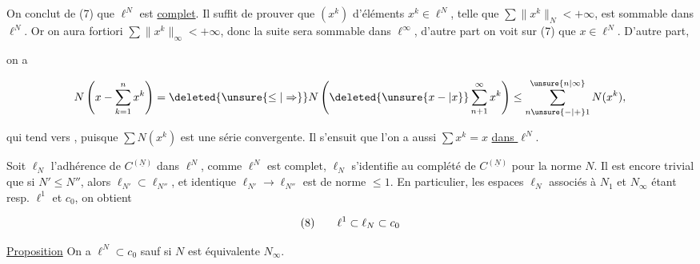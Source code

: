 
On conclut de (7) que $\ell^N$ est \uline{complet}. Il suffit de prouver que   $(x^k)$  d'éléments $x^k\in\ell^N$, telle que $\sum\lVert x^{k}\rVert_N<+\infty$, est sommable dans $\ell^N$. Or  on aura  fortiori $\sum\lVert x^k\rVert_\infty<+\infty$, donc la  suite sera sommable dans $\ell^\infty$,  d'autre part on  voit sur (7) que $x\in\ell^N$. D'autre part,

{\reversemarginpar{}}

on a

\[
N\left(x-\sum_{k=1}^n x^k\right)=\deleted{\unsure{\leq|\Rightarrow}}N\left(\deleted{\unsure{x-|x}}\sum_{n+1}^\infty x^k\right)\leq\sum_{n\unsure{-|+}1}^{\unsure{n|\infty}}N(x^k),
\]

qui tend vers , puisque $\sum N(x^k)$ est une série convergente. Il s'ensuit que l'on a aussi $\sum x^k=x$ \uline{dans $\ell^N$}.

Soit $\ell_N$ l'adhérence de $C^{(\underline N)}$ dans $\ell^N$, comme $\ell^N$ est complet, $\ell_N$ s'identifie au complété de $C^{(\underline N)}$ pour la norme $N$. Il est encore trivial que si $N'\leq N''$, alors $\ell_{N'}\subset\ell_{N''}$, et  identique $\ell_{N'}\to\ell_{N''}$ est de norme $\leq 1$. En particulier, les espaces $\ell_N$ associés à $N_1$ et $N_\infty$ étant resp. $\ell^1$ et $c_0$, on obtient

\[
\begin{array}{@{}l@{\qquad}l@{}}
(8)&\displaystyle \ell^1\subset\ell_N\subset c_0
\end{array}
\]

{\reversemarginpar{}}

\uline{Proposition} On a $\ell^N\subset c_0$ sauf si $N$ est équivalente  $N_\infty$.

